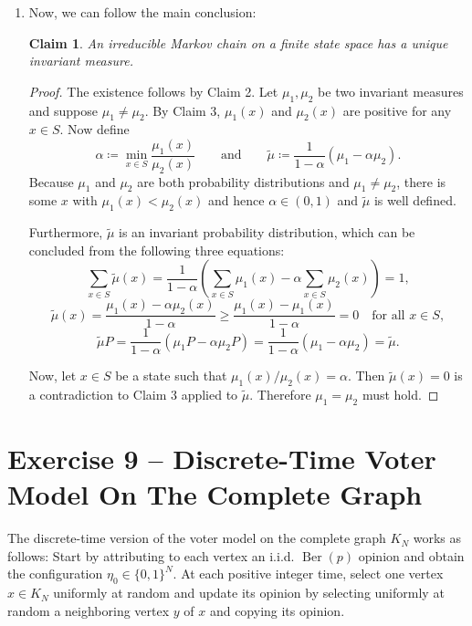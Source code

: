 \documentclass[a4paper]{amsart}
\DeclareMathOperator{\Ber}{Ber}
\theoremstyle{theorem}
\newtheorem{claim}{Claim}
\theoremstyle{definition}
\begin{document}
\begin{enumerate}[label=\alph*)]
\item Now, we can follow the main conclusion:
\begin{claim}
	An irreducible Markov chain on a finite state space has a unique invariant measure.
\end{claim}
\begin{proof}
	The existence follows by Claim 2.
	Let $\mu_1,\mu_2$ be two invariant measures and suppose $\mu_1 \neq \mu_2$.
	By Claim 3, $\mu_1(x)$ and $\mu_2(x)$ are positive for any $x\in S$.
	Now define $$
	\alpha \coloneqq \min_{x\in S} \frac{\mu_1(x)}{\mu_2(x)}
	\hspace{2em}\text{and}\hspace{2em}
	\tilde{\mu} \coloneqq \frac{1}{1-\alpha} (\mu_1 - \alpha \mu_2).
	$$
	Because $\mu_1$ and $\mu_2$ are both probability distributions and $\mu_1\neq \mu_2$, there is some $x$ with $\mu_1(x) < \mu_2(x)$ and hence $\alpha \in (0, 1)$ and $\tilde{\mu}$ is well defined.
	
	Furthermore, $\tilde{\mu}$ is an invariant probability distribution, which can be concluded from the following three equations:
	$$\sum_{x\in S} \tilde{\mu} (x) = \frac{1}{1-\alpha} \left(\sum_{x\in S} \mu_1(x) - \alpha\sum_{x\in S}\mu_2(x)\right) = 1,
	$$
	$$\tilde{\mu}(x) = \frac{\mu_1(x) - \alpha\mu_2(x)}{1- \alpha} \geq \frac{\mu_1(x) - \mu_1(x)}{1 - \alpha} = 0 \hspace{1em}\text{for all $x\in S$},$$
	$$\tilde{\mu}P = \frac{1}{1-\alpha} (\mu_1 P - \alpha \mu_2 P) = \frac{1}{1 - \alpha} (\mu_1 - \alpha \mu_2) = \tilde{\mu}.$$
	
	Now, let $x\in S$ be a state such that $\mu_1(x) / \mu_2(x) = \alpha$.
	Then $\tilde{\mu}(x) = 0$ is a contradiction to Claim 3 applied to $\tilde{\mu}$.
	Therefore $\mu_1= \mu_2$ must hold.
\end{proof}
\end{enumerate}

\clearpage

\section*{Exercise 9 -- Discrete-Time Voter Model On The Complete Graph}



The discrete-time version of the voter model on the complete graph $K_N$ works as follows:
Start by attributing to each vertex an i.i.d. $\Ber(p)$ opinion and obtain the configuration $\eta_0\in \{0,1\}^N$.
At each positive integer time, select one vertex $x\in K_N$ uniformly at random and update its opinion by selecting uniformly at random a neighboring vertex $y$ of $x$ and copying its opinion.
\end{document}
